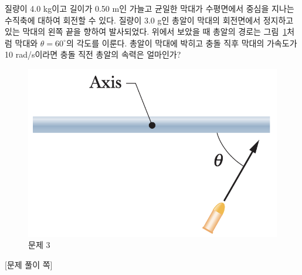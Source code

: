 \documentclass[floatfix,nofootinbib,superscriptaddress,fleqn,preprint]{revtex4}
\begin{document}
질량이 4.0 kg이고 길이가 0.50 m인 가늘고 균일한 막대가 수평면에서
중심을 지나는 수직축에 대하여 회전할 수 있다. 질량이 3.0 g인 총알이
막대의 회전면에서 정지하고 있는 막대의 왼쪽 끝을 향하여
발사되었다. 위에서 보았을 때 총알의 경로는 그림~\ref{fig:3}처럼 막대와
$\theta=60^\circ$의 각도를 이룬다. 총알이 막대에 박히고 충돌 직후
막대의 가속도가 10 rad/s이라면 충돌 직전 총알의 속력은 얼마인가? 
\begin{figure}[ht]
  \centering
\includegraphics[scale=0.4]{Qfig14-3-20220427.png}
  \caption{문제 3}
  \label{fig:3}
\end{figure}
\newpage
{\color{gray} [문제 풀이 쪽]}

\newpage
\end{document}
